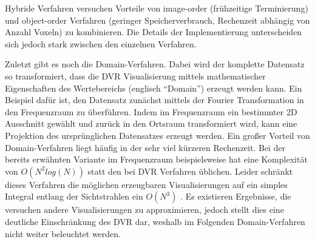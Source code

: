 \documentclass[a4paper,fontsize=12pt,toc=bib,halfparskip]{scrartcl}
\begin{document}
Hybride Verfahren versuchen Vorteile von image-order (fr\"uhzeitige Terminierung) und object-order Verfahren (geringer Speicherverbrauch, Rechenzeit abh\"angig von Anzahl Voxeln) zu kombinieren. Die Details der Implementierung unterscheiden sich jedoch stark zwischen den einzelnen Verfahren. 

Zuletzt gibt es noch die Domain-Verfahren. Dabei wird der komplette Datensatz so transformiert, dass die DVR Visualisierung mittels mathematischer Eigenschaften des Wertebereichs (englisch ``Domain'') erzeugt werden kann. Ein Beispiel daf\"ur ist, den Datensatz zun\"achst mittels der Fourier Transformation in den Frequenzraum zu \"uberf\"uhren. Indem im Frequenzraum ein bestimmter 2D Ausschnitt gew\"ahlt und zur\"uck in den Ortsraum transformiert wird, kann eine Projektion des urspr\"unglichen Datensatzes erzeugt werden. Ein gro{\ss}er Vorteil von Domain-Verfahren liegt h\"aufig in der sehr viel k\"urzeren Rechenzeit. Bei der bereits erw\"ahnten Variante im Frequenzraum beispielsweise hat eine Komplexit\"at von $O(N^2 log(N))$ statt den bei DVR Verfahren \"ublichen. Leider schr\"ankt dieses Verfahren die m\"oglichen erzeugbaren Visualisierungen auf ein simples Integral entlang der Sichtstrahlen ein $O(N^3)$ \cite[S.~143]{hansen2005visualization}. Es existieren Ergebnisse, die versuchen andere Visualisierungen zu approximieren, jedoch stellt dies eine deutliche Einschr\"ankung des DVR dar, weshalb im Folgenden Domain-Verfahren nicht weiter beleuchtet werden.
\end{document}
